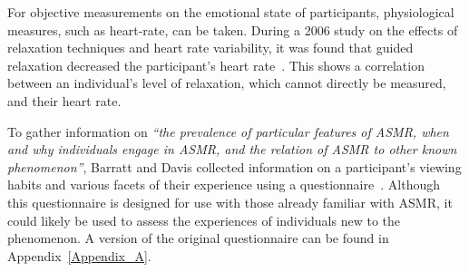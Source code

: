 \documentclass{sigchi}
\newcommand{\inlinequote}[1]{\textit{``#1''}}
\begin{document}
For objective measurements on the emotional state of participants, physiological measures, such as heart-rate, can be taken. During a 2006 study on the effects of relaxation techniques and heart rate variability, it was found that guided relaxation decreased the participant's heart rate~\cite{sarang2006effects}. This shows a correlation between an individual's level of relaxation, which cannot directly be measured, and their heart rate.

To gather information on \inlinequote{the prevalence of particular features of ASMR, when and why individuals engage in ASMR, and the relation of ASMR to other known phenomenon}, Barratt and Davis collected information on a participant's viewing habits and various facets of their experience using a questionnaire~\cite{barratt2015autonomous}. Although this questionnaire is designed for use with those already familiar with ASMR, it could likely be used to assess the experiences of individuals new to the phenomenon. A version of the original questionnaire can be found in Appendix~\ref{Appendix_A}. 



\end{document}
